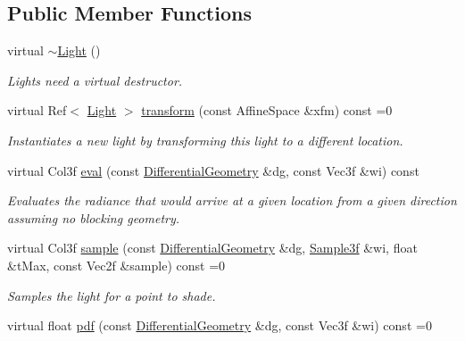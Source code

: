 \subsection*{Public Member Functions}
\begin{DoxyCompactItemize}
\item 
virtual \hyperlink{classembree_1_1_light_a542a6f5ed399189c0cf2e815f0774a7c}{$\sim$Light} ()
\begin{DoxyCompactList}\small\item\em Lights need a virtual destructor. \item\end{DoxyCompactList}\item 
virtual Ref$<$ \hyperlink{classembree_1_1_light}{Light} $>$ \hyperlink{classembree_1_1_light_a6e5d5e7c2088ec4dad231c91d99c3a30}{transform} (const AffineSpace \&xfm) const =0
\begin{DoxyCompactList}\small\item\em Instantiates a new light by transforming this light to a different location. \item\end{DoxyCompactList}\item 
virtual Col3f \hyperlink{classembree_1_1_light_a5cc835d46bd10b81c7253512cfd8c9e5}{eval} (const \hyperlink{structembree_1_1_differential_geometry}{DifferentialGeometry} \&dg, const Vec3f \&wi) const 
\begin{DoxyCompactList}\small\item\em Evaluates the radiance that would arrive at a given location from a given direction assuming no blocking geometry. \item\end{DoxyCompactList}\item 
virtual Col3f \hyperlink{classembree_1_1_light_aaa63d3794340c4a82183b9b7481d51be}{sample} (const \hyperlink{structembree_1_1_differential_geometry}{DifferentialGeometry} \&dg, \hyperlink{structembree_1_1_sample}{Sample3f} \&wi, float \&tMax, const Vec2f \&sample) const =0
\begin{DoxyCompactList}\small\item\em Samples the light for a point to shade. \item\end{DoxyCompactList}\item 
virtual float \hyperlink{classembree_1_1_light_ad53daeeb3376083cb75c13e6b1be2c5e}{pdf} (const \hyperlink{structembree_1_1_differential_geometry}{DifferentialGeometry} \&dg, const Vec3f \&wi) const =0

\end{DoxyCompactItemize}

